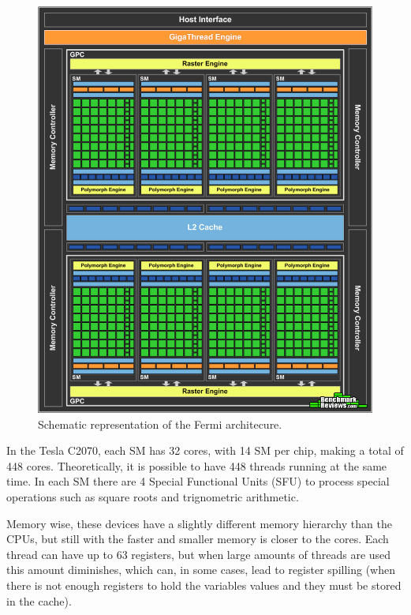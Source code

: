 \begin{figure}[!htp]
	\begin{center}
		\includegraphics[scale=0.25]{../../common/img/fermi_arch.png}
		\caption{Schematic representation of the \nvidia Fermi architecure.}
		\label{fig:fermi}
	\end{center}
\end{figure}

In the Tesla C2070, each SM has 32 \cuda cores, with 14 SM per chip, making a total of 448 \cuda cores. Theoretically, it is possible to have 448 \cuda threads running at the same time. In each SM there are 4 Special Functional Units (SFU) to process special operations such as square roots and trignometric arithmetic.

Memory wise, these devices have a slightly different memory hierarchy than the CPUs, but still with the faster and smaller memory is closer to the \cuda cores. Each \cuda thread can have up to 63 registers, but when large amounts of threads are used this amount diminishes, which can, in some cases, lead to register spilling (when there is not enough registers to hold the variables values and they must be stored in the cache).


